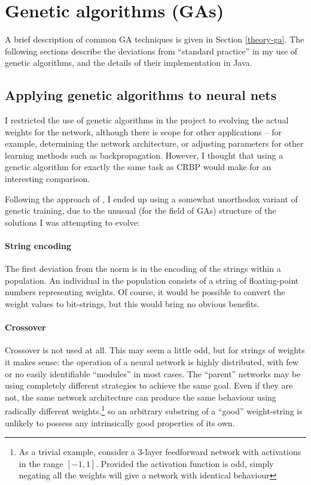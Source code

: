 \documentclass[a4paper]{report}
\begin{document}
\section{Genetic algorithms (GAs)}

A brief description of common GA techniques is given in Section
\ref{theory-ga}. The following sections describe the deviations from
``standard practice'' in my use of genetic algorithms, and the details
of their implementation in Java.

\subsection{Applying genetic algorithms to neural nets}

\label{theory-ga-nn}
I restricted the use of genetic algorithms in the project to evolving
the actual weights for the network, although there is scope for other
applications -- for example, determining the network architecture, or
adjusting parameters for other learning methods such as
backpropagation. However, I thought that using a genetic algorithm for
exactly the same task as CRBP would make for an interesting
comparison.

Following the approach of \cite{meeden96}, I ended up using a somewhat
unorthodox variant of genetic training, due to the unusual (for the
field of GAs) structure of the solutions I was attempting to evolve:

\paragraph{String encoding}
The first deviation from the norm is in the encoding of the strings
within a population. An individual in the population consists of a
string of floating-point numbers representing weights. Of course, it
would be possible to convert the weight values to bit-strings, but
this would bring no obvious benefits.

\paragraph{Crossover}
Crossover is not used at all. This may seem a little odd, but for
strings of weights it makes sense: the operation of a neural network
is highly distributed, with few or no easily identifiable ``modules''
in most cases. The ``parent'' networks may be using completely
different strategies to achieve the same goal. Even if they are not,
the same network architecture can produce the same behaviour using
radically different weights.\footnote{As a trivial example, consider a
  3-layer feedforward network with activations in the range $[-1,1]$.
  Provided the activation function is odd, simply negating all the
  weights will give a network with identical behaviour} so an
arbitrary substring of a ``good'' weight-string is unlikely to possess
any intrinsically good properties of its own.
\end{document}

